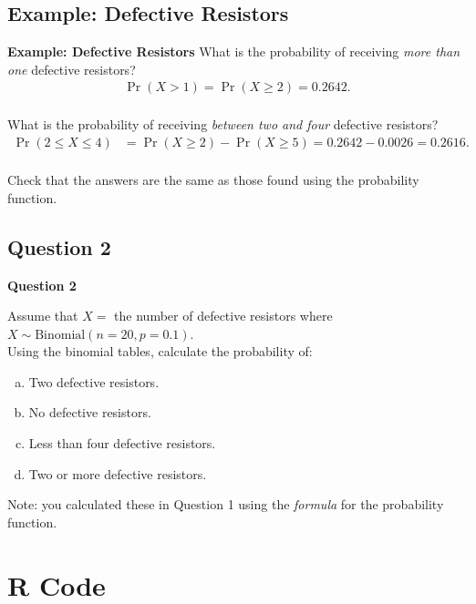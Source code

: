 \documentclass[compress]{beamer}        %
\makeatletter
\newcommand{\tcb}{\textcolor{beamer@blendedblue}}
\makeatother
\begin{document}
\subsection{Example: Defective Resistors}
\begin{frame}{\bf \tcb{Example: Defective Resistors}}
What is the probability of receiving \emph{more than one} defective resistors?
\begin{align*}
\Pr(X>1) = \Pr(X\ge2) = 0.2642.\\
\end{align*}

What is the probability of receiving \emph{between two and four} defective resistors?
\begin{align*}
\Pr(2\le X \le 4) &= \Pr(X\ge2) - \Pr(X\ge5) = 0.2642 - 0.0026 = 0.2616.\\
\end{align*}

Check that the answers are the same as those found using the probability function.
\end{frame}



\subsection{Question 2}
\begin{frame}{\bf \tcb{Question 2}}

Assume that $X =$ the number of defective resistors where $X \sim \text{Binomial}(n=20,p=0.1)$.\\[0.3cm]
Using the binomial tables, calculate the probability of:\\[0.2cm]

\begin{enumerate}[a)]\itemsep0.2cm
\item Two defective resistors.
\item No defective resistors.
\item Less than four defective resistors.
\item Two or more defective resistors.\\[0.8cm]
\end{enumerate}

Note: you calculated these in Question 1 using the \emph{formula} for the probability function.

\end{frame}



\section{R Code}
\end{document}
